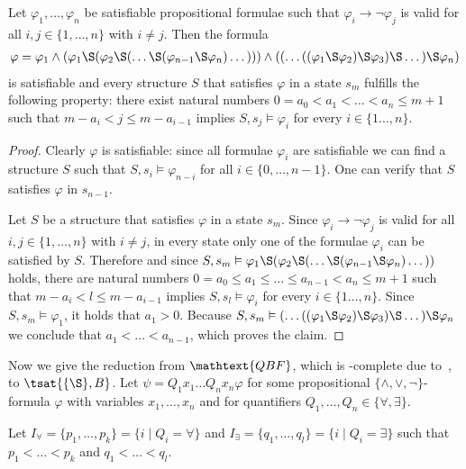         \begin{claim}
          Let $\varphi_1,\dots,\varphi_n$ be satisfiable propositional formulae such that $\varphi_i\rightarrow\neg\varphi_j$ is valid for all $i,j\in\{1,\dots,n\}$ with $i\neq j$. Then the formula
          \begin{equation*}
            \begin{split}
              \varphi =\varphi_1
                 \wedge(\varphi_1\S(\varphi_2\S(\dots\S(\varphi_{n-1}\S\varphi_n)\dots)))
                 \wedge((\dots((\varphi_1\S\varphi_2)\S\varphi_3)\S\dots)\S\varphi_n)
\end{split}
          \end{equation*}
          is satisfiable and every structure $S$ that satisfies $\varphi$ in a state $s_m$ fulfills the following property: there exist natural numbers $0=a_0<a_1<\dots<a_n\leq m+1$ such that $m-a_i< j\leq m-a_{i-1}$ implies $S,s_j\vDash\varphi_i$ for every $i\in\{1\dots,n\}$.
        \end{claim}
        \begin{proof}
          Clearly $\varphi$ is satisfiable: since all formulae $\varphi_i$ are satisfiable we can find a structure $S$ such that $S,s_i\vDash\varphi_{n-i}$ for all $i\in\{0,\dots,n-1\}$. One can verify that $S$ satisfies $\varphi$ in $s_{n-1}$.

          Let $S$ be a structure that satisfies $\varphi$ in a state $s_m$. Since $\varphi_i\rightarrow\neg\varphi_j$ is valid for all $i,j\in\{1,\dots,n\}$ with $i\neq j$, in every state only one of the formulae $\varphi_i$ can be satisfied by $S$. Therefore and since $S,s_m\vDash \varphi_1\S(\varphi_2\S(\dots\S(\varphi_{n-1}\S\varphi_n)\dots))$ holds, there are natural numbers $0=a_0\leq a_1\leq\dots\leq a_{n-1}<a_n\leq m+1$ such that $m-a_i< l\leq m-a_{i-1}$ implies $S,s_l\vDash\varphi_i$ for every $i\in\{1\dots,n\}$. Since $S,s_m\vDash\varphi_1$, it holds that $a_1>0$. Because $S,s_m\vDash(\dots((\varphi_1\S\varphi_2)\S\varphi_3)\S\dots)\S\varphi_n$ we conclude that $a_1<\dots <a_{n-1}$, which proves the claim.
        \end{proof}
        Now we give the reduction from $\mathtext{QBF}$, which is \PSPACE-complete due to~\cite{sto77}, to $\tsat{\{\S\},B}$. Let
$\psi=Q_1x_1\dots Q_nx_n\varphi$
        for some propositional $\{\wedge,\vee,\neg\}$-formula $\varphi$ with variables $x_1,\dots,x_n$ and for quantifiers $Q_1,\dots,Q_n\in\{\forall,\exists\}$.

        Let $I_{\forall}=\{p_1,\dots,p_k\}=\{i\mid Q_i=\forall\}$ and
        $I_{\exists}=\{q_1,\dots,q_l\}=\{i\mid Q_i=\exists\}$ such that $p_1<\dots<p_k$ and $q_1<\dots<q_l$.

